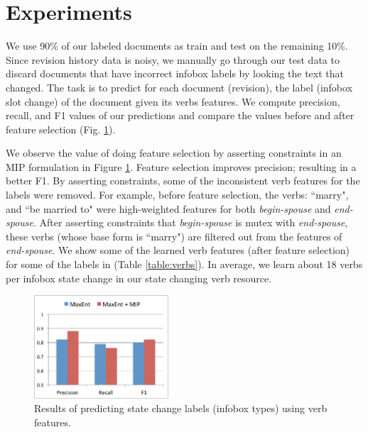 \section{Experiments}

We use 90\% of our labeled documents as train and test on the remaining 10\%. Since revision history data is noisy, we manually go through our test data to discard documents that have incorrect infobox  labels by looking the  text that  changed. The task is to predict for each document (revision), the label (infobox slot change) of the document given its verbs features. We compute precision, recall, and F1 values of our predictions  and compare the values before and after feature selection (Fig. \ref{fig:result}).


We observe the value of doing feature selection by asserting constraints in an MIP formulation in Figure \ref{fig:result}. Feature selection improves precision; resulting in a better F1. By asserting constraints, some of the  inconsistent verb features for the labels were removed. For example, before feature selection, the verbs: ``marry", and ``be married to" were high-weighted features for both \textit{begin-spouse} and \textit{end-spouse}. After asserting constraints that \textit{begin-spouse} is mutex with \textit{end-spouse}, these verbs (whose base form is ``marry") are filtered out from the features of \textit{end-spouse}. We show some of the learned verb features (after feature selection) for some of the labels in (Table \ref{table:verbs}). In average, we learn about 18 verbs per infobox state change in our state changing verb resource. 

\begin{figure}
\begin{center}
\includegraphics[width=5cm,keepaspectratio=true]{figures/result.pdf}
\caption{\label{fig:result} Results of predicting state change labels (infobox types) using verb features.}
\end{center}
\end{figure}

